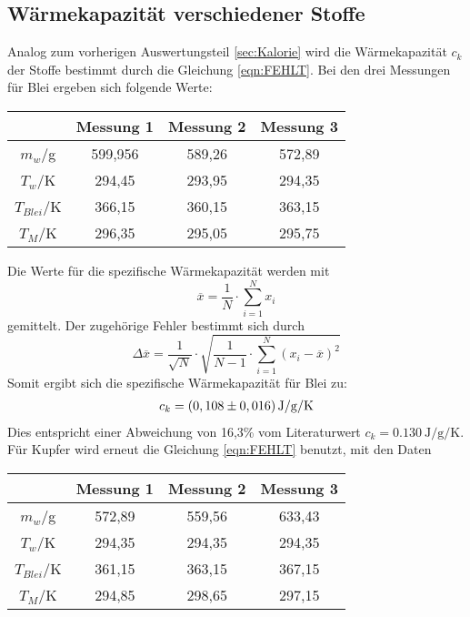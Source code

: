 \subsection{Wärmekapazität verschiedener Stoffe}
\label{sec:verschiedeneStoffe}
Analog zum vorherigen Auswertungsteil \ref{sec:Kalorie} wird die Wärmekapazität $c_k$ der Stoffe bestimmt durch die Gleichung \ref{eqn:FEHLT}.
Bei den drei Messungen für Blei ergeben sich folgende Werte:
\begin{table}
  \centering
  \label{tab:WerteBlei}
  \begin{tabular}{c c c c}
   \toprule
   & Messung 1 & Messung 2 & Messung 3 \\
   \midrule
   $m_w$/g & 599,956 & 589,26 & 572,89 \\
   $T_w$/K & 294,45 & 293,95 & 294,35 \\
   $T_{Blei}$/K & 366,15 & 360,15 & 363,15 \\
   $T_M$/K & 296,35 & 295,05 & 295,75 \\
   \bottomrule
  \end{tabular}
\end{table}
\newpage
Die Werte für die spezifische Wärmekapazität werden mit
\begin{equation}
  \overline{x} = \frac{1}{N} \cdot \sum_{i=1}^N x_i
\end{equation}
gemittelt. Der zugehörige Fehler bestimmt sich durch 
\begin{equation}
  \Delta \overline{x} = \frac{1}{\sqrt{N}} \cdot \sqrt{\frac{1}{N-1} \cdot \sum_{i=1}^N \left(x_i - \overline{x}\right)^2}
\end{equation}
Somit ergibt sich die spezifische Wärmekapazität für Blei zu:
\begin{align*}
  c_k = \left(0,108 \pm 0,016 \right) \si{{\joule\per\gram\per\kelvin}}
\end{align*}
Dies entspricht einer Abweichung von 16,3\% vom Literaturwert $c_k = \SI{0,130}{\joule\per\gram\per\kelvin}$.
Für Kupfer wird erneut die Gleichung \ref{eqn:FEHLT} benutzt, mit den Daten
\begin{table}
  \centering
  \label{tab:WerteBlei}
  \begin{tabular}{c c c c}
   \toprule
   & Messung 1 & Messung 2 & Messung 3 \\
   \midrule
   $m_w$/g & 572,89 & 559,56 & 633,43 \\
   $T_w$/K & 294,35 & 294,35 & 294,35 \\
   $T_{Blei}$/K & 361,15 & 363,15 & 367,15 \\
   $T_M$/K & 294,85 & 298,65 & 297,15 \\
   \bottomrule
  \end{tabular}
\end{table}
